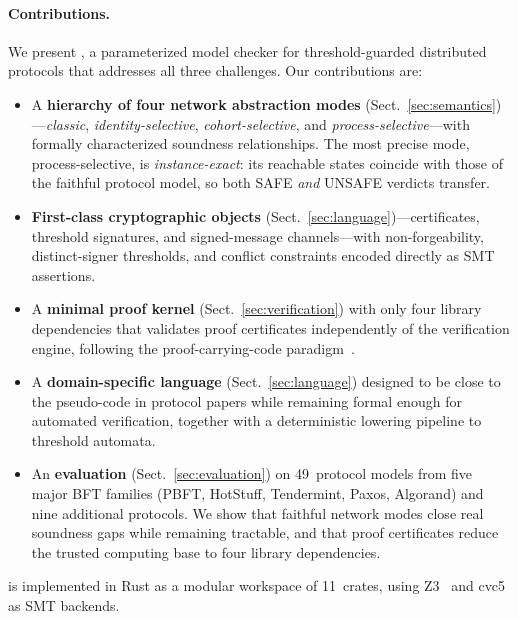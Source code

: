 \paragraph{Contributions.}
We present \tarsier{}, a parameterized model checker for threshold-guarded
distributed protocols that addresses all three challenges.  Our
contributions are:

\begin{itemize}
\item A \textbf{hierarchy of four network abstraction modes}
  (Sect.~\ref{sec:semantics})---\emph{classic}, \emph{identity-selective},
  \emph{cohort-selective}, and \emph{process-selective}---with formally
  characterized soundness relationships.  The most precise mode,
  process-selective, is \emph{instance-exact}: its reachable states
  coincide with those of the faithful protocol model, so both SAFE
  \emph{and} UNSAFE verdicts transfer.

\item \textbf{First-class cryptographic objects}
  (Sect.~\ref{sec:language})---certificates, threshold signatures, and
  signed-message channels---with non-forgeability, distinct-signer
  thresholds, and conflict constraints encoded directly as SMT
  assertions.

\item A \textbf{minimal proof kernel} (Sect.~\ref{sec:verification})
  with only four library dependencies that validates proof certificates
  independently of the verification engine, following the
  proof-carrying-code paradigm~\cite{Necula1997}.

\item A \textbf{domain-specific language} (Sect.~\ref{sec:language})
  designed to be close to the pseudo-code in protocol papers while
  remaining formal enough for automated verification, together with
  a deterministic lowering pipeline to threshold automata.

\item An \textbf{evaluation} (Sect.~\ref{sec:evaluation}) on
  49~protocol models from five major BFT families (PBFT, HotStuff,
  Tendermint, Paxos, Algorand) and nine additional protocols.  We show
  that faithful network modes close real soundness gaps while remaining
  tractable, and that proof certificates reduce the trusted computing
  base to four library dependencies.
\end{itemize}

\tarsier{} is implemented in Rust as a modular workspace of 11~crates,
using Z3~\cite{DeMoura2008} and cvc5~\cite{BarbosaBBKLMMMN2022} as
SMT backends.
